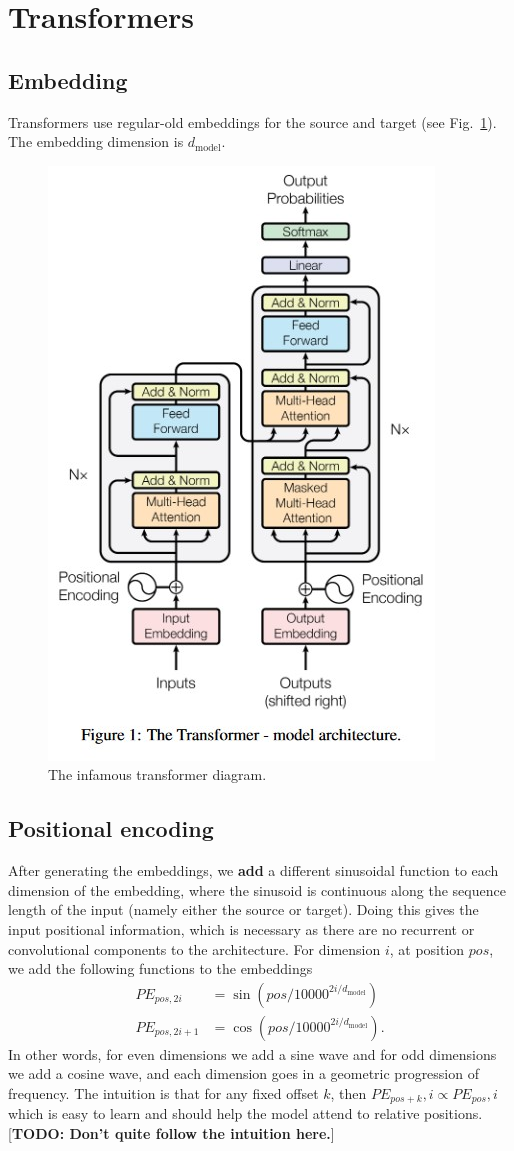 \documentclass[11pt]{article}
\numberwithin{equation}{section}
\begin{document}
\newcommand{\dmodel}{d_{\text{model}}}

\section{Transformers}


\subsection{Embedding}
Transformers \citep{Vaswani17} use regular-old embeddings for the source and target (see Fig.~\ref{fig:tfm}). The embedding dimension is $\dmodel$.

\begin{figure}
\begin{center}
\includegraphics[width=0.4\columnwidth]{../figures/transformer.jpg}  
\end{center}
\caption{The infamous transformer diagram.}
\label{fig:tfm}
\end{figure}


\subsection{Positional encoding}
After generating the embeddings, we \textbf{add} a different sinusoidal function to each dimension of the embedding, where the sinusoid is continuous along the sequence length of the input (namely either the source or target). Doing this gives the input positional information, which is necessary as there are no recurrent or convolutional components to the architecture. For dimension $i$, at position $pos$, we add the following functions to the embeddings
\begin{align}
PE_{pos, 2i} &= \sin\left(pos/10000^{2i/\dmodel}\right) \\
PE_{pos, 2i+1} &= \cos\left(pos/10000^{2i/\dmodel}\right). 
\end{align}
In other words, for even dimensions we add a sine wave and for odd dimensions we add a cosine wave, and each dimension goes in a geometric progression of frequency. The intuition is that for any fixed offset $k$, then $PE_{pos+k},i \propto PE_{pos},i$ which is easy to learn and should help the model attend to relative positions. [\textbf{TODO: Don't quite follow the intuition here.}]
\end{document}
